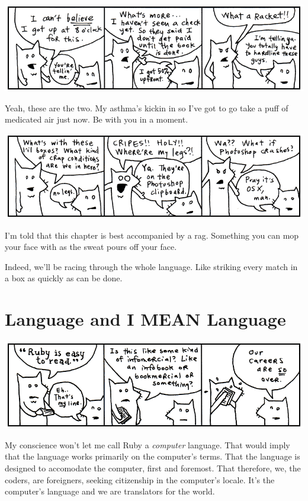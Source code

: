 \documentclass[10pt,twoside]{report}
\begin{document}
	\includegraphics[width=1.0\textwidth]{cache/5.png}

Yeah, these are the two.  My asthma's kickin in so I've got to go take
a puff of medicated air just now.  Be with you in a moment.

	\includegraphics[width=1.0\textwidth]{cache/6.png}

I'm told that this chapter is best accompanied by a rag.  Something
you can mop your face with as the sweat pours off your face.

Indeed, we'll be racing through the whole language.  Like striking
every match in a box as quickly as can be done.


\section{Language and I MEAN Language}

	\includegraphics[width=1.0\textwidth]{cache/7.png}

My conscience won't let me call Ruby a {\em computer} language.  That
would imply that the language works primarily on the computer's terms.
That the language is designed to accomodate the computer, first and
foremost.  That therefore, we, the coders, are foreigners, seeking
citizenship in the computer's locale.  It's the computer's language
and we are translators for the world.
\end{document}
